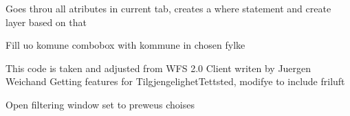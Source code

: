\documentclass[letterpaper,10pt,english]{sphinxmanual}
\begin{document}
\begin{fulllineitems}
\begin{fulllineitems}
\begin{quote}
\begin{description}
\end{description}\end{quote}

\end{fulllineitems}


\begin{fulllineitems}
\label{\detokenize{code:Tilgjengelighet.Tilgjengelighet.filtrer}}
Goes throu all atributes in current tab, creates a where statement and create layer based on that

\end{fulllineitems}


\begin{fulllineitems}
\label{\detokenize{code:Tilgjengelighet.Tilgjengelighet.fylke_valgt}}
Fill uo komune combobox with kommune in chosen fylke

\end{fulllineitems}


\begin{fulllineitems}
\label{\detokenize{code:Tilgjengelighet.Tilgjengelighet.getFeatures}}
This code is taken and adjusted from WFS 2.0 Client writen by Juergen Weichand
Getting features for TilgjengelighetTettsted, modifye to include friluft

\end{fulllineitems}


\begin{fulllineitems}
\label{\detokenize{code:Tilgjengelighet.Tilgjengelighet.get_previus_search_activeLayer}}
Open filtering window set to preweus choises

\end{fulllineitems}



\end{fulllineitems}
\end{document}
